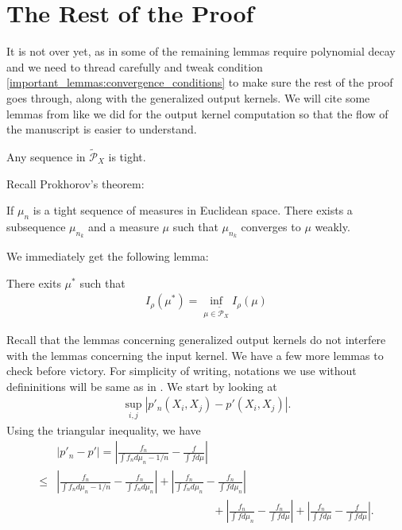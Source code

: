 \documentclass[10pt]{article}
\begin{document}
\section{The Rest of the Proof}
It is not over yet, as in \cite{auffinger-tsne} some of the remaining lemmas
require polynomial decay and we need to thread carefully and tweak condition
\ref{important_lemmas:convergence_conditions} to make sure the rest of the
proof goes through, along with the generalized output kernels. We will cite
some lemmas from \cite{auffinger-tsne} like we did for the output kernel
computation so that the flow of the manuscript is easier to understand.
\begin{lemma}
  Any sequence in $\tilde{\mathcal{P}}_X$ is tight.
\end{lemma}
Recall Prokhorov's theorem:
\begin{theorem*}
  If $\mu_n$ is a tight sequence of measures in Euclidean space. There exists a subsequence $\mu_{n_k}$ and a measure $\mu$ such that $\mu_{n_k}$ converges to $\mu$ weakly.
\end{theorem*}
We immediately get the following lemma:
\begin{lemma} \label{mu_star_lemma}
  There exits $\mu^*$ such that
  \begin{align}
    I_{\rho}(\mu^*) = \inf_{\mu \in \tilde{\mathcal{P}}_X} I_{\rho}(\mu)
  \end{align}
\end{lemma}
Recall that the lemmas concerning generalized output kernels do not interfere with the lemmas concerning the input kernel. We have a few more lemmas to check before victory. For simplicity of writing, notations we use without defininitions will be same as in \cite{auffinger-tsne}. We start by looking at
\begin{align}
  \sup_{i,j}|p'_n(X_i,X_j)-p'(X_i,X_j)|.
\end{align}
Using the triangular inequality, we have
\begin{align}
       & |p'_n - p'| = \left|\frac{f_n}{\int f_n d\mu_n - 1/n} - \frac{f}{\int f d \mu}\right| \nonumber                                                                                       \\
  \leq & \left|\frac{f_n}{\int f_n d\mu_n - 1/n} - \frac{f_n}{\int f_n d \mu_n}\right| + \left|\frac{f_n}{\int f_n d\mu_n} - \frac{f_n}{\int f d \mu_n}\right| \nonumber                       \\
       & \qquad \qquad \qquad \qquad \qquad \qquad \qquad + \left|\frac{f_n}{\int f d\mu_n} - \frac{f_n}{\int f d \mu}\right| + \left|\frac{f_n}{\int f d\mu} - \frac{f}{\int f d \mu}\right|.
\end{align}
\end{document}
